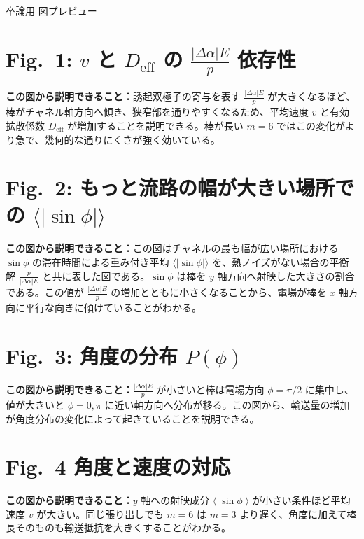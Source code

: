 \documentclass[dvipdfmx,a4paper]{jsarticle}
\newcommand{\figexplain}[1]{%
  \par\vspace{0.8em}%
  \noindent\textbf{この図から説明できること：}#1\par
}
\begin{document}
\begin{center}\large 卒論用 図プレビュー\end{center}

\section*{Fig.~1: $v$ と $D_{\mathrm{eff}}$ の $\frac{|\Delta \alpha|E}{p}$ 依存性}
\begin{center}\end{center}
\figexplain{誘起双極子の寄与を表す $\frac{|\Delta \alpha|E}{p}$ が大きくなるほど、棒がチャネル軸方向へ傾き、狭窄部を通りやすくなるため、平均速度 $v$ と有効拡散係数 $D_{\mathrm{eff}}$ が増加することを説明できる。棒が長い $m=6$ ではこの変化がより急で、幾何的な通りにくさが強く効いている。}
\clearpage

\section*{Fig.~2: もっと流路の幅が大きい場所での $\langle|\sin\phi|\rangle$}
\begin{center}\end{center}
\figexplain{この図はチャネルの最も幅が広い場所における $\sin \phi$ の滞在時間による重み付き平均 $\langle|\sin\phi|\rangle$ を、熱ノイズがない場合の平衡解 $\frac{p}{|\Delta \alpha| E}$ と共に表した図である。$\sin \phi$ は棒を $y$ 軸方向へ射映した大きさの割合である。この値が $\frac{|\Delta \alpha|E}{p}$ の増加とともに小さくなることから、電場が棒を $x$ 軸方向に平行な向きに傾けていることがわかる。}
\clearpage

\section*{Fig.~3: 角度の分布 $P(\phi)$}
\begin{center}\end{center}
\figexplain{$\frac{|\Delta \alpha|E}{p}$ が小さいと棒は電場方向 $\phi=\pi/2$ に集中し、値が大きいと $\phi=0,\pi$ に近い軸方向へ分布が移る。この図から、輸送量の増加が角度分布の変化によって起きていることを説明できる。}
\clearpage

\section*{Fig.~4 角度と速度の対応}
\begin{center}\end{center}
\figexplain{$y$ 軸への射映成分 $\langle|\sin\phi|\rangle$ が小さい条件ほど平均速度 $v$ が大きい。同じ張り出しでも $m=6$ は $m=3$ より遅く、角度に加えて棒長そのものも輸送抵抗を大きくすることがわかる。}
\clearpage
\end{document}

